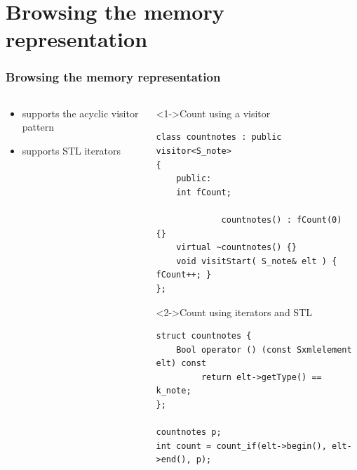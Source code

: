 \documentclass{beamer}
\begin{document}
\section{Browsing the memory representation}
\begin{frame}[fragile]
	\frametitle{Browsing the memory representation}

	\begin{columns}
		\begin{column}[c]{50mm}
		\begin{itemize}
			\item<1-> supports the acyclic visitor pattern
		\vspace{25mm}
			\item<2-> supports STL iterators
	   \end{itemize}
		\end{column}

		\begin{column}[c]{65mm}
		\begin{block}<1->{Count using a visitor}
\begin{lstlisting}
class countnotes : public visitor<S_note>
{
    public:
    int fCount;

             countnotes() : fCount(0)	{}
    virtual ~countnotes() {}
    void visitStart( S_note& elt ) { fCount++; }
};
\end{lstlisting}
		\end{block}

		\begin{block}<2->{Count using iterators and STL}
\begin{lstlisting}
struct countnotes {
    Bool operator () (const Sxmlelement elt) const
         return elt->getType() == k_note;
};

countnotes p;
int count = count_if(elt->begin(), elt->end(), p);
\end{lstlisting}
		\end{block}
		\end{column}
	\end{columns}
\end{frame}

\end{document}
